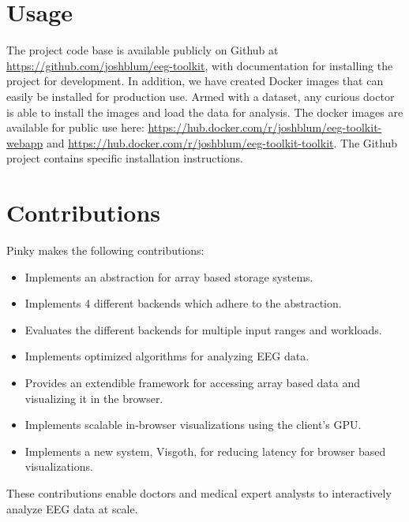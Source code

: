 \section{Usage}

The project code base is available publicly on Github \cite{github} at
\url{https://github.com/joshblum/eeg-toolkit}, with documentation for installing
the project for development. In addition, we have created Docker \cite{docker}
images that can easily be installed for production use. Armed with a dataset, any
curious doctor is able to install the images and load the data for
analysis. The docker images are available for public use here:
\url{https://hub.docker.com/r/joshblum/eeg-toolkit-webapp} and
\url{https://hub.docker.com/r/joshblum/eeg-toolkit-toolkit}. The Github project
contains specific installation instructions.

\section{Contributions}

Pinky makes the following contributions:

\begin{itemize}

  \item Implements an abstraction for array based storage systems.

  \item Implements 4 different backends which adhere to the abstraction.

  \item Evaluates the different backends for multiple input ranges and
    workloads.

  \item Implements optimized algorithms for analyzing EEG data.

  \item Provides an extendible framework for accessing array based data and
    visualizing it in the browser.

  \item Implements scalable in-browser visualizations using the client's GPU.

  \item Implements a new system, Visgoth, for reducing latency for browser
    based visualizations.

\end{itemize}

These contributions enable doctors and medical expert analysts to interactively
analyze EEG data at scale.

